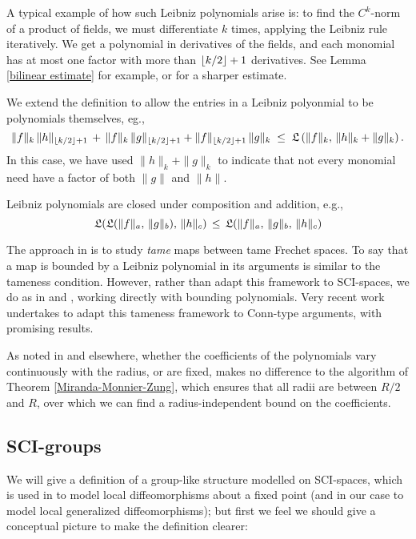 \documentclass{article}
\begin{document}
\begin{rem}\label{Leibniz example}
A typical example of how such Leibniz polynomials arise is: to find the $C^k$-norm of a product of fields, we must differentiate $k$ times, applying the Leibniz rule iteratively. We get a polynomial in derivatives of the fields, and each monomial has at most one factor with more than ${\left\lfloor k/2 \right\rfloor+1}$ derivatives.  See Lemma \ref{bilinear estimate} for example, or \cite[II.2.2.3]{Hamilton} for a sharper estimate.
\end{rem}

We extend the definition to allow the entries in a Leibniz polyonmial to be polynomials themselves, eg.,
$$\|f\|_k\,\|h\|_{\left\lfloor k/2 \right\rfloor+1} \,+\, \|f\|_k\, \|g\|_{\left\lfloor k/2 \right\rfloor+1} + \|f\|_{\left\lfloor k/2 \right\rfloor+1}\, \|g\|_k \;\leq\; \mathfrak{L}\left(\|f\|_k,\, \|h\|_k+\|g\|_k\right).$$
In this case, we have used $\|h\|_k+\|g\|_k$ to indicate that not every monomial need have a factor of both $\|g\|$ and $\|h\|$.
\begin{lem}
Leibniz polynomials are closed under composition and addition, e.g.,
$$\mathfrak{L}(\mathfrak{L}(\|f\|_a,\, \|g\|_b),\, \|h\|_c) \,\leq\, \mathfrak{L}(\|f\|_a,\, \|g\|_b,\, \|h\|_c)$$
\end{lem}

\begin{rem}
The approach in \cite{Hamilton} is to study \emph{tame} maps between tame Frechet spaces.  To say that a map is bounded by a Leibniz polynomial in its arguments is similar to the tameness condition.  However, rather than adapt this framework to SCI-spaces, we do as in \cite{MonnierZung} and \cite{MirandaMonnierZung}, working directly with bounding polynomials.  Very recent work \cite{Marcut} undertakes to adapt this tameness framework to Conn-type arguments, with promising results.
\end{rem}

\begin{rem}\label{radius dependence}
As noted in \cite{MonnierZung} and elsewhere, whether the coefficients of the polynomials vary continuously with the radius, or are fixed, makes no difference to the algorithm of Theorem \ref{Miranda-Monnier-Zung}, which ensures that all radii are between $R/2$ and $R$, over which we can find a radius-independent bound on the coefficients.
\end{rem}

\subsection*{SCI-groups}
We will give a definition of a group-like structure modelled on SCI-spaces, which is used in \cite{MirandaMonnierZung} to model local diffeomorphisms about a fixed point (and in our case to model local generalized diffeomorphisms); but first we feel we should give a conceptual picture to make the definition clearer:
\end{document}
